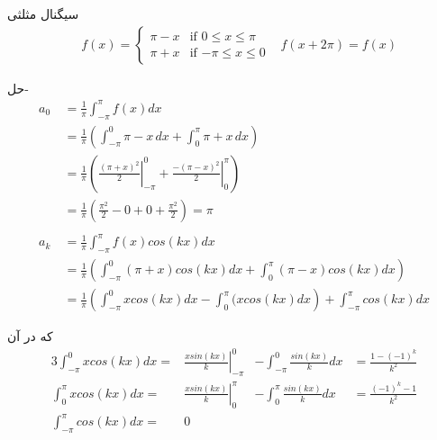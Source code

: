 \begin{example}
 
 سیگنال مثلثی
\begin{align*}
 &f(x)=
 \begin{cases}
 \pi-x &\mbox{if  } { 0\le x\le \pi}
 \\
 \pi+x &\mbox{if  }  {-\pi\le x \le 0}
 \end{cases}
 &f(x+2\pi)=f(x)
\end{align*}

\hrulefill

حل- 
 \begin{equation*}
 \begin{aligned}
 a_0 {} &\ = \frac{1}{\pi}\int_{-\pi}^\pi{f(x)dx}\\
 &\ =\frac{1}{\pi}\left(\int_{-\pi}^0{\pi-x \, dx}+\int_0^\pi{\pi+x \, dx}\right)\\
 &\ =\frac{1}{\pi}\left(
 \left.{\frac{(\pi+x)^2}{2}}\right |_{-\pi}^0
 +
  \left.{\frac{-(\pi-x)^2}{2}}\right |_0^\pi
 \right)\\
 &\ = \frac{1}{\pi}\left(
 \frac{\pi^2}{2}-0+0+\frac{\pi^2}{2}
 \right)= \pi
 \\\\
  a_k {} &\ = \frac{1}{\pi}\int_{-\pi}^\pi{f(x)cos(kx)dx}\\
 &\ = \frac{1}{\pi}\left(
 \int_{-\pi}^{0}{(\pi+x)cos(kx) dx} +\int_{0}^{\pi}{(\pi-x)cos(kx)dx}
 \right)\\
 &\ = \frac{1}{\pi}\left(
 \int_{-\pi}^{0}{xcos(kx) dx} -\int_{0}^{\pi}{(xcos(kx)dx}
 \right)
 +
 \int_{-\pi}^{\pi}{cos(kx)dx}
 \end{aligned}
 \end{equation*}

 که در آن 
 \begin{alignat*}{3}
 \int_{-\pi}^{0}{xcos(kx)dx}
 = & \left.{\frac{xsin(kx)}{k}}\right |_{-\pi}^{0} & -\int_{-\pi}^{0}{\frac{sin(kx)}{k}dx}
 &= \frac{1-(-1)^k}{k^2}
\\
 \int_{0}^{\pi}{xcos(kx)dx}
 = & \left.{\frac{xsin(kx)}{k}}\right |_{0}^{\pi} & -\int_{0}^{\pi}{\frac{sin(kx)}{k}dx}
 &=\frac{(-1)^k-1}{k^2}
 \\
 \int_{-\pi}^{\pi}{cos(kx)dx}=& 0
 \end{alignat*}


\end{example}
